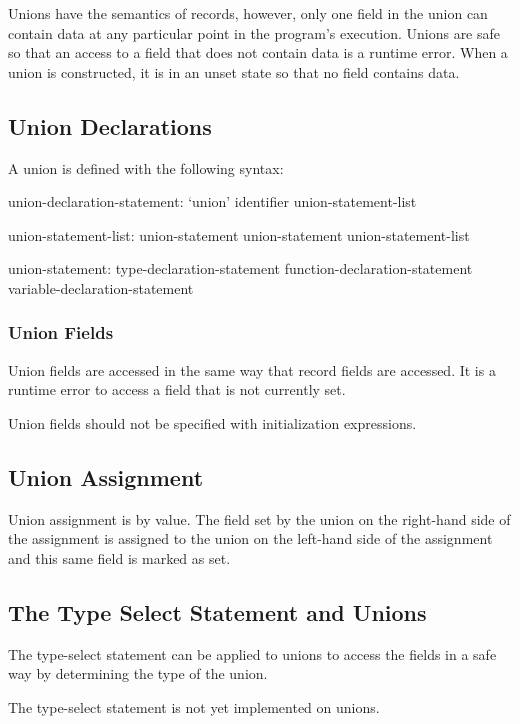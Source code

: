 \label{Unions}

Unions have the semantics of records, however, only one field in the
union can contain data at any particular point in the program's
execution.  Unions are safe so that an access to a field that does not
contain data is a runtime error.  When a union is constructed, it is
in an unset state so that no field contains data.

\subsection{Union Declarations}
\label{Union_Declarations}

A union is defined with the following syntax:
\begin{syntax}
union-declaration-statement:
  `union' identifier { union-statement-list }

union-statement-list:
  union-statement
  union-statement union-statement-list

union-statement:
  type-declaration-statement
  function-declaration-statement
  variable-declaration-statement
\end{syntax}

\subsubsection{Union Fields}
\label{Union_Fields}

Union fields are accessed in the same way that record fields are
accessed.  It is a runtime error to access a field that is not
currently set.

Union fields should not be specified with initialization expressions.

\subsection{Union Assignment}
\label{Union_Assignment}

Union assignment is by value.  The field set by the union on the
right-hand side of the assignment is assigned to the union on the
left-hand side of the assignment and this same field is marked as set.

\subsection{The Type Select Statement and Unions}
\label{The_Type_Select_Statement_and_Unions}

The type-select statement can be applied to unions to access the
fields in a safe way by determining the type of the union.
\begin{status}
The type-select statement is not yet implemented on unions.
\end{status}
